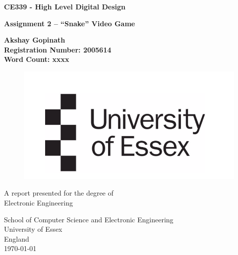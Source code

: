 \documentclass[aps, secnumarabic, balancelastpage, asmath, amssymb, nofootinbib, floatfix,]{revtex4-2}
\begin{document}
    \begin{titlepage}
   \begin{center}
       \vspace*{1cm}

	\Huge
       \textbf{CE339 - High Level Digital Design}

       \vspace{0.5cm}
       
       \LARGE
        \textbf{Assignment 2 -- ``Snake'' Video Game}
            
       \vspace{1.5cm}

       \textbf{Akshay Gopinath}\\
       \textbf{Registration Number: 2005614}\\
       \textbf{Word Count: xxxx}\\

       \vfill
        \begin{figure}[h]
        
        \includegraphics[scale = 0.85]{University}
        
   	\end{figure}
        \vfill
            
       A report presented for the degree of\\
       Electronic Engineering
            
       \vspace{1cm}
     
            
       School of Computer Science and Electronic Engineering\\
       University of Essex\\
       England\\
       \today

   \end{center}
\end{titlepage}
\end{document}
